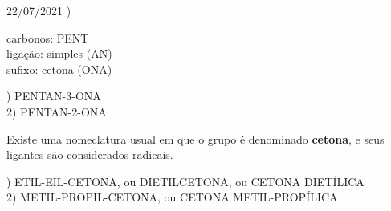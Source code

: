 \documentclass{SchoolBook}
\begin{document}
\begin{day}{22/07/2021}
        ) 
        
        \vspace{6pt}
         carbonos: PENT \\
        ligação: simples (AN)  \\
        sufixo: cetona (ONA)
        
        \vspace{6pt}
        ) PENTAN-3-ONA \\
        2) PENTAN-2-ONA
        
        \vspace{12pt}
        Existe uma nomeclatura usual em que o grupo  é denominado \textbf{cetona}, e seus ligantes são considerados radicais.
        
        \vspace{6pt}
        ) ETIL-EIL-CETONA, ou DIETILCETONA, ou CETONA DIETÍLICA \\
        2) METIL-PROPIL-CETONA, ou CETONA METIL-PROPÍLICA
    \end{day}
    
\end{document}

